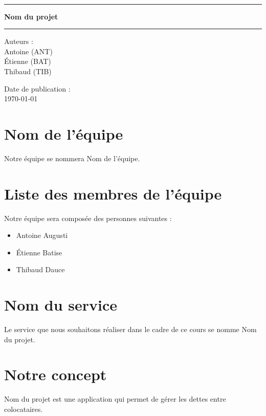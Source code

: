 \documentclass[a4paper, 12pt, french]{article}
\newcommand{\nomProjet}{Nom du projet\xspace}
\newcommand{\nomEquipe}{Nom de l'équipe\xspace}
\begin{document}
	\begin{titlepage}
		\begin{center}
			\LARGE{} \\
		    \rule{\linewidth}{1.5pt}
		    \huge{\textbf{\nomProjet}}
		    \rule{\linewidth}{1.5pt} \newline{} \newline{}
		\end{center}
		\begin{center}
		    \large{Auteurs :}\\ Antoine  (ANT)\\ Étienne  (BAT) \\ Thibaud  (TIB)
		\end{center}
		\vspace{50px}
		\begin{center}
			\large{Date de publication :}\\ \today
		\end{center}
	\end{titlepage}
	\newpage

	\tableofcontents
	\pagebreak

	\section{Nom de l'équipe}
	Notre équipe se nommera \nomEquipe.

	\section{Liste des membres de l'équipe}
	Notre équipe sera composée des personnes suivantes :
	\begin{itemize}
		\item Antoine Augusti
		\item Étienne Batise
		\item Thibaud Dauce 
	\end{itemize}

	\section{Nom du service}
	Le service que nous souhaitons réaliser dans le cadre de ce cours se nomme \nomProjet.

	\section{Notre concept}
	\nomProjet est une application qui permet de gérer les dettes entre colocataires.
\end{document}
